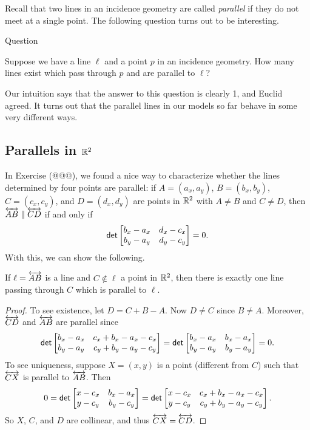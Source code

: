 Recall that two lines in an incidence geometry are called \emph{parallel} if they do not meet at a single point. The following question turns out to be interesting.

\begin{titlebox}{Question}
\begin{center}
Suppose we have a line $\ell$ and a point $p$ in an incidence geometry. How many lines exist which pass through $p$ and are parallel to $\ell$?
\end{center}
\end{titlebox}

Our intuition says that the answer to this question is clearly 1, and Euclid agreed. It turns out that the parallel lines in our models so far behave in some very different ways.



\subsection{Parallels in $\mathbb{R}^2$}

In Exercise (@@@), we found a nice way to characterize whether the lines determined by four points are parallel: if $A = (a_x, a_y)$, $B = (b_x, b_y)$, $C = (c_x, c_y)$, and $D = (d_x, d_y)$ are points in $\mathbb{R}^2$ with $A \neq B$ and $C \neq D$, then $\overleftrightarrow{AB} \parallel \overleftrightarrow{CD}$ if and only if \[ \mathsf{det} \begin{bmatrix} b_x - a_x & d_x - c_x \\ b_y - a_y & d_y - c_y \end{bmatrix} = 0. \] With this, we can show the following.

\begin{prop}
If $\ell = \overleftrightarrow{AB}$ is a line and $C \notin \ell$ a point in $\mathbb{R}^2$, then there is exactly one line passing through $C$ which is parallel to $\ell$.
\end{prop}

\begin{proof}
To see existence, let $D = C + B - A$. Now $D \neq C$ since $B \neq A$. Moreover, $\overleftrightarrow{CD}$ and $\overleftrightarrow{AB}$ are parallel since
\[ \mathsf{det} \begin{bmatrix} b_x - a_x & c_x + b_x - a_x - c_x \\ b_y - a_y & c_y + b_y - a_y - c_y \end{bmatrix}
 = \mathsf{det} \begin{bmatrix} b_x - a_x & b_x - a_x \\ b_y - a_y & b_y - a_y \end{bmatrix} = 0. \]
To see uniqueness, suppose $X = (x, y)$ is a point (different from $C$) such that $\overleftrightarrow{CX}$ is parallel to $\overleftrightarrow{AB}$. Then \[ 0 = \mathsf{det} \begin{bmatrix} x - c_x & b_x - a_x \\ y - c_y & b_y - c_y \end{bmatrix} = \mathsf{det} \begin{bmatrix} x - c_x & c_x + b_x - a_x - c_x \\ y - c_y & c_y + b_y - a_y - c_y \end{bmatrix}. \] So $X$, $C$, and $D$ are collinear, and thus $\overleftrightarrow{CX} = \overleftrightarrow{CD}$.
\end{proof}

